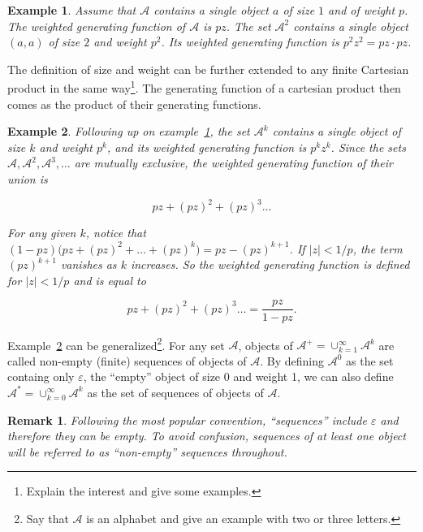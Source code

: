 \documentclass{article}
\newtheorem{example}{Example}
\newtheorem{remark}{Remark}
\begin{document}
\begin{example}
\label{ex:simple}
Assume that $\mathcal{A}$ contains a single object $a$ of size $1$ and of
weight $p$. The weighted generating function of $\mathcal{A}$ is $pz$.
The set $\mathcal{A}^2$ contains a single object $(a,a)$ of size $2$ and
weight $p^2$. Its weighted generating function is $p^2z^2 = pz \cdot pz$.
\end{example}

The definition of size and weight can be further extended to any finite
Cartesian product in the same way\footnote{Explain the interest and give
some examples.}. The generating function of a cartesian
product then comes as the product of their generating functions.

\begin{example}
\label{ex:sequences}
Following up on example~\ref{ex:simple}, the set $\mathcal{A}^k$ contains
a single object of size $k$ and weight $p^k$, and its weighted generating
function is $p^kz^k$. Since the sets $\mathcal{A}, \mathcal{A}^2,
\mathcal{A}^3,\ldots$ are mutually exclusive, the weighted generating
function of their union is

\begin{equation*}
pz + (pz)^2 + (pz)^3 \ldots
\end{equation*}

For any given $k$, notice that $(1-pz) \big(pz + (pz)^2 + \ldots + (pz)^k
\big) = pz-(pz)^{k+1}$.  If $|z| < 1/p$, the term $(pz)^{k+1}$ vanishes as
$k$ increases. So the weighted generating function is defined for $|z| <
1/p$ and is equal to

\begin{equation*}
pz + (pz)^2 + (pz)^3 \ldots = \frac{pz}{1-pz}.
\end{equation*}
\end{example}

Example~\ref{ex:sequences} can be generalized\footnote{Say that
$\mathcal{A}$ is an alphabet and give an example with two or three
letters.}. For any set $\mathcal{A}$, objects of $\mathcal{A}^+ =
\cup_{k=1}^\infty\mathcal{A}^k$ are called non-empty (finite) sequences of
objects of $\mathcal{A}$. By defining $\mathcal{A}^0$ as the set containg
only $\varepsilon$, the ``empty'' object of size 0 and weight 1, we can
also define $\mathcal{A}^* = \cup_{k=0}^\infty\mathcal{A}^k$ as the set of
sequences of objects of $\mathcal{A}$.

\begin{remark}
Following the most popular convention, ``sequences'' include $\varepsilon$
and therefore they can be empty. To avoid confusion, sequences of at least
one object will be referred to as ``non-empty'' sequences throughout.
\end{remark}
\end{document}
